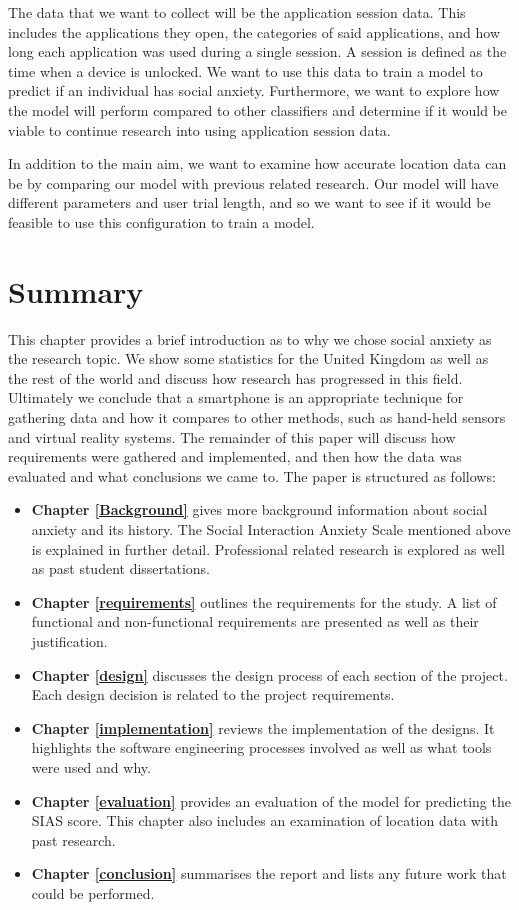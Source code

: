 \documentclass{l4proj}
\begin{document}
The data that we want to collect will be the application session data. This includes the applications they open, the categories of said applications, and how long each application was used during a single session. A session is defined as the time when a device is unlocked. We want to use this data to train a model to predict if an individual has social anxiety. Furthermore, we want to explore how the model will perform compared to other classifiers and determine if it would be viable to continue research into using application session data.

In addition to the main aim, we want to examine how accurate location data can be by comparing our model with previous related research. Our model will have different parameters and user trial length, and so we want to see if it would be feasible to use this configuration to train a model.

\section{Summary}
This chapter provides a brief introduction as to why we chose social anxiety as the research topic. We show some statistics for the United Kingdom as well as the rest of the world and discuss how research has progressed in this field. Ultimately we conclude that a smartphone is an appropriate technique for gathering data and how it compares to other methods, such as hand-held sensors and virtual reality systems. The remainder of this paper will discuss how requirements were gathered and implemented, and then how the data was evaluated and what conclusions we came to. The paper is structured as follows:
\begin{itemize}
    \item \textbf{Chapter \ref{Background}} gives more background information about social anxiety and its history. The Social Interaction Anxiety Scale mentioned above is explained in further detail. Professional related research is explored as well as past student dissertations.
    \item \textbf{Chapter \ref{requirements}} outlines the requirements for the study. A list of functional and non-functional requirements are presented as well as their justification.
    \item \textbf{Chapter \ref{design}} discusses the design process of each section of the project. Each design decision is related to the project requirements.
    \item \textbf{Chapter \ref{implementation}} reviews the implementation of the designs. It highlights the software engineering processes involved as well as what tools were used and why.
    \item \textbf{Chapter \ref{evaluation}} provides an evaluation of the model for predicting the SIAS score. This chapter also includes an examination of location data with past research.
    \item \textbf{Chapter \ref{conclusion}} summarises the report and lists any future work that could be performed.
\end{itemize}
\end{document}
